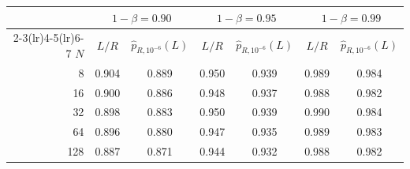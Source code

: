   \begin{tabular}{rcccccc}
    \toprule
     & \multicolumn{2}{c}{$1-\beta = 0.90$} & \multicolumn{2}{c}{$1-\beta = 0.95$} & \multicolumn{2}{c}{$1-\beta = 0.99$} \\
    \cmidrule(lr){2-3}\cmidrule(lr){4-5}\cmidrule(lr){6-7}
    $N$ & $L/R$ & $\widehat p_{R,10^{-6}}(L)$ & $L/R$ & $\widehat p_{R,10^{-6}}(L)$ & $L/R$ & $\widehat p_{R,10^{-6}}(L)$ \\
    \midrule
    8 & 0.904 & 0.889 & 0.950 & 0.939 & 0.989 & 0.984 \\
    16 & 0.900 & 0.886 & 0.948 & 0.937 & 0.988 & 0.982 \\
    32 & 0.898 & 0.883 & 0.950 & 0.939 & 0.990 & 0.984 \\
    64 & 0.896 & 0.880 & 0.947 & 0.935 & 0.989 & 0.983 \\
    128 & 0.887 & 0.871 & 0.944 & 0.932 & 0.988 & 0.982 \\
    \bottomrule
  \end{tabular}%
